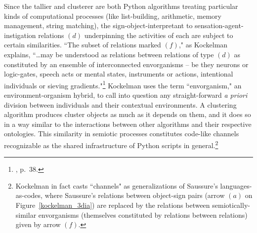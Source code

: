 Since the tallier and clusterer are both Python algorithms treating particular kinds of computational processes (like list-building, arithmetic, memory management, string matching), the sign-object-interpretant to sensation-agent-instigation relations $(d)$ underpinning the activities of each are subject to certain similarities.  ``The subset of relations marked $(f)$," as Kockelman explains, ``\ldots may be understood as relations between relations of type $(d)$ as constituted by an ensemble of interconnected envorganisms -- be they neurons or logic-gates, speech acts or mental states, instruments or actions, intentional individuals or sieving gradients."\footnote{\cite{kockelman2013}, p.\ 38.}  Kockelman uses the term ``envorganism," an environment-organism hybrid, to call into question any straight-forward \emph{a priori} division between individuals and their contextual environments.  A clustering algorithm produces cluster objects as much as it depends on them, and it does so in a way similar to the interactions between other algorithms and their respective ontologies.  This similarity in semiotic processes constitutes code-like channels recognizable as the shared infrastructure of Python scripts in general.\footnote{Kockelman in fact casts ``channels" as generalizations of Saussure's languages-as-codes, where Saussure's relations between object-sign pairs (arrow $(a)$ on Figure~\ref{kockelman_3dia}) are replaced by the relations between semiotically-similar envorganisms (themselves constituted by relations between relations) given by arrow $(f)$.}

